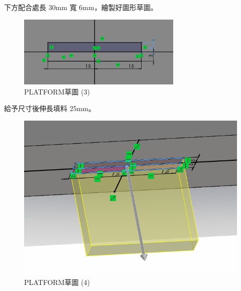 下方配合處長 30mm 寬 6mm，繪製好圖形草圖。

\begin{figure}[htbp]
    \centering
    \includegraphics[width=0.7\textwidth]{./../images/6-1-15}
    \caption{PLATFORM草圖 (3)}
\end{figure}

給予尺寸後伸長填料 25mm。
\begin{figure}[h!]
    \centering
    \begin{minipage}[b]{0.6\textwidth}
        \centering
        \includegraphics[width=\textwidth,height=0.22\textheight]{./../images/6-1-16}
        \caption{PLATFORM草圖 (4)}
        \label{fig:platform}
    \end{minipage}
    \hfill
    \begin{minipage}[b]{0.35\textwidth}
        \centering

\end{minipage}
\end{figure}
